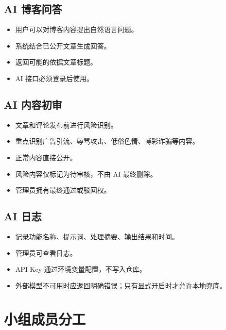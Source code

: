 \documentclass[UTF8,a4paper,12pt]{ctexart}
\begin{document}
\subsection{AI 博客问答}

\begin{itemize}
  \item 用户可以对博客内容提出自然语言问题。
  \item 系统结合已公开文章生成回答。
  \item 返回可能的依据文章标题。
  \item AI 接口必须登录后使用。
\end{itemize}

\subsection{AI 内容初审}

\begin{itemize}
  \item 文章和评论发布前进行风险识别。
  \item 重点识别广告引流、辱骂攻击、低俗色情、博彩诈骗等内容。
  \item 正常内容直接公开。
  \item 风险内容仅标记为待审核，不由 AI 最终删除。
  \item 管理员拥有最终通过或驳回权。
\end{itemize}

\subsection{AI 日志}

\begin{itemize}
  \item 记录功能名称、提示词、处理摘要、输出结果和时间。
  \item 管理员可查看日志。
  \item API Key 通过环境变量配置，不写入仓库。
  \item 外部模型不可用时应返回明确错误；只有显式开启时才允许本地兜底。
\end{itemize}

\section{小组成员分工}
\end{document}
